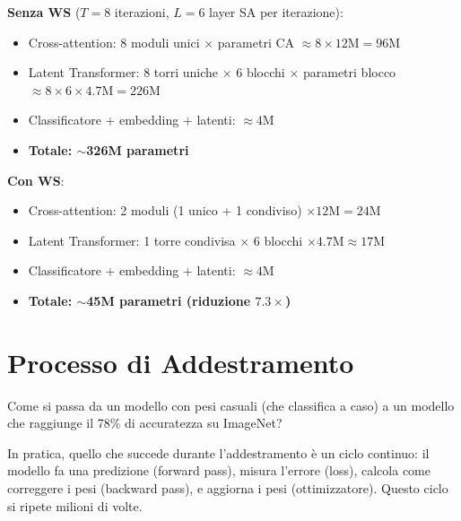 \documentclass[12pt,a4paper]{article}
\begin{document}
\begin{examplebox}
\textbf{Senza WS} ($T = 8$ iterazioni, $L = 6$ layer SA per iterazione):
\begin{itemize}
    \item Cross-attention: 8 moduli unici $\times$ parametri CA $\approx 8 \times 12\text{M} = 96\text{M}$
    \item Latent Transformer: 8 torri uniche $\times$ 6 blocchi $\times$ parametri blocco $\approx 8 \times 6 \times 4.7\text{M} = 226\text{M}$
    \item Classificatore + embedding + latenti: $\approx 4\text{M}$
    \item \textbf{Totale: $\sim$326M parametri}
\end{itemize}

\textbf{Con WS}:
\begin{itemize}
    \item Cross-attention: 2 moduli (1 unico + 1 condiviso) $\times 12\text{M} = 24\text{M}$
    \item Latent Transformer: 1 torre condivisa $\times$ 6 blocchi $\times 4.7\text{M} \approx 17\text{M}$
    \item Classificatore + embedding + latenti: $\approx 4\text{M}$
    \item \textbf{Totale: $\sim$45M parametri (riduzione $7.3\times$)}
\end{itemize}
\end{examplebox}


\newpage
\section{Processo di Addestramento} \label{sec:training}

Come si passa da un modello con pesi casuali (che classifica a caso) a un modello che raggiunge il 78\% di accuratezza su ImageNet?

In pratica, quello che succede durante l'addestramento \`e un ciclo continuo: il modello fa una predizione (forward pass), misura l'errore (loss), calcola come correggere i pesi (backward pass), e aggiorna i pesi (ottimizzatore). Questo ciclo si ripete milioni di volte.
\end{document}
